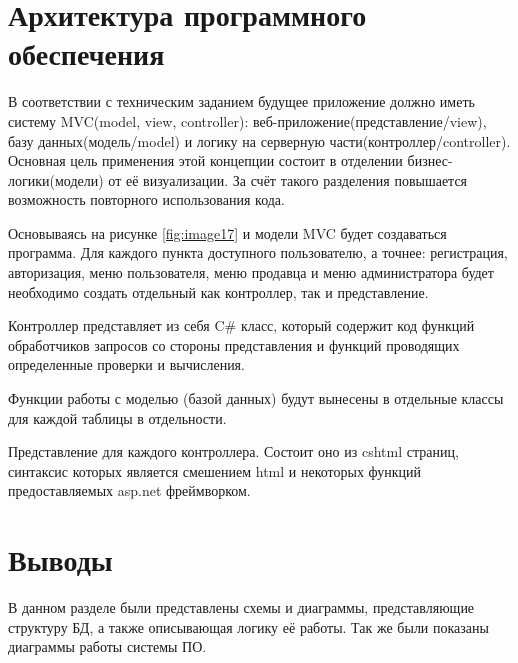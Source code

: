 \newpage

\section{Архитектура программного обеспечения}

\hspace{0.6cm} В соответствии с техническим заданием будущее приложение должно иметь систему MVC(model, view, controller): веб-приложение(представление/view), базу данных(модель/model) и логику на серверную части(контроллер/controller). Основная цель применения этой концепции состоит в отделении бизнес-логики(модели) от её визуализации. За счёт такого разделения повышается возможность повторного использования кода.

\hspace{0.6cm} Основываясь на рисунке \ref{fig:image17} и модели MVC будет создаваться программа. Для каждого пункта доступного пользователю, а точнее: регистрация, авторизация, меню пользователя, меню продавца и меню администратора будет необходимо создать отдельный как контроллер, так и представление.

\hspace{0.6cm} Контроллер представляет из себя C\# класс, который содержит код функций обработчиков запросов со стороны представления и функций проводящих определенные проверки и вычисления.

\hspace{0.6cm} Функции работы с моделью (базой данных) будут вынесены в отдельные классы для каждой таблицы в отдельности.

\hspace{0.6cm} Представление для каждого контроллера. Состоит оно из cshtml страниц, синтаксис которых является смешением html и некоторых функций предоставляемых asp.net фреймворком.

\section{Выводы}

\hspace{0.6cm} В данном разделе были представлены схемы и диаграммы, представляющие структуру БД, а также описывающая логику её работы. Так же были показаны диаграммы работы системы ПО.

